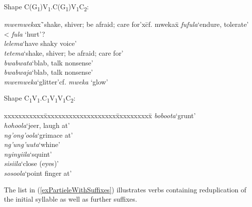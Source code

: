 \begin{exe}
\ex \begin{xlist} \label{exPartielleOhneSuffixe}
\ex Shape C(G\textsubscript{1})V\textsubscript{1}.C(G\textsubscript{1})V\textsubscript{1}C\textsubscript{2}:
\begin{tabbing}
\textit{mwemweka}x\=`shake, shiver; be afraid; care for'x\=cf. mwekax\=\kill%
\textit{fufula}\>`endure, tolerate'\> < \textit{fula} \lq hurt'?\\
\textit{lelema}\>`have shaky voice'\\
\textit{tetema}\>`shake, shiver; be afraid; care for'\\
\textit{bwabwata}\>`blab, talk nonsense'\\
\textit{bwabwaja}\>`blab, talk nonsense'\\
\textit{mwemweka}\>`glitter'\>cf. \textit{mweka} \lq glow'
\end{tabbing}

\clearpage

\ex Shape C\textsubscript{1}V\textsubscript{1}.C\textsubscript{1}V\textsubscript{1}V\textsubscript{1}C\textsubscript{2}:
\begin{tabbing}
xxxxxxxxxxx\=xxxxxxxxxxxxxxxxxxxx\=xxxxxxxxxx\=\kill
\textit{boboota}\>`grunt'\\
\textit{hohoola}\>`jeer, laugh at'\\
\textit{ng'ong'oola}\>`grimace at'\\
\textit{ng'ung'uuta}\>`whine'\\
\textit{nyinyiila}\>\lq squint'\\
\textit{sisiila}\>`close (eyes)'\\	%
\textit{sosoola}\>`point finger at'
\end{tabbing}
\end{xlist}
\end{exe}
The list in (\ref{exPartieleWithSuffixes}) illustrates verbs containing reduplication of the initial syllable as well as further suffixes.

